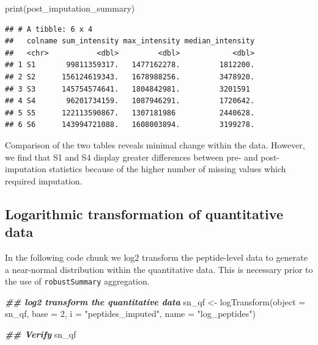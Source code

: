 \documentclass[9pt,a4paper,]{extarticle}
\newenvironment{Shaded}{\begin{snugshade}}{\end{snugshade}}
\newcommand{\AttributeTok}[1]{\textcolor[rgb]{0.77,0.63,0.00}{#1}}
\newcommand{\DecValTok}[1]{\textcolor[rgb]{0.00,0.00,0.81}{#1}}
\newcommand{\DocumentationTok}[1]{\textcolor[rgb]{0.56,0.35,0.01}{\textbf{\textit{#1}}}}
\newcommand{\FunctionTok}[1]{\textcolor[rgb]{0.00,0.00,0.00}{#1}}
\newcommand{\NormalTok}[1]{#1}
\newcommand{\OtherTok}[1]{\textcolor[rgb]{0.56,0.35,0.01}{#1}}
\newcommand{\StringTok}[1]{\textcolor[rgb]{0.31,0.60,0.02}{#1}}
\begin{document}
\begin{Shaded}
\begin{Highlighting}[]
\FunctionTok{print}\NormalTok{(post\_imputation\_summary)}
\end{Highlighting}
\end{Shaded}

\begin{verbatim}
## # A tibble: 6 x 4
##   colname sum_intensity max_intensity median_intensity
##   <chr>           <dbl>         <dbl>            <dbl>
## 1 S1       99811359317.   1477162278.         1812200.
## 2 S2      156124619343.   1678988256.         3478920.
## 3 S3      145754574641.   1804842981.         3201591 
## 4 S4       96201734159.   1087946291.         1720642.
## 5 S5      122113590867.   1307181986          2440628.
## 6 S6      143994721088.   1608003894.         3199278.
\end{verbatim}

Comparison of the two tables reveals minimal change within the data. However, we
find that S1 and S4 display greater differences between pre- and post-imputation
statistics because of the higher number of missing values which required
imputation.

\hypertarget{logarithmic-transformation-of-quantitative-data-1}{%
\subsection{Logarithmic transformation of quantitative data}\label{logarithmic-transformation-of-quantitative-data-1}}

In the following code chunk we log2 transform the peptide-level data to generate
a near-normal distribution within the quantitative data. This is necessary prior
to the use of \texttt{robustSummary} aggregation.

\begin{Shaded}
\begin{Highlighting}[]
\DocumentationTok{\#\# log2 transform the quantitative data}
\NormalTok{sn\_qf }\OtherTok{\textless{}{-}} \FunctionTok{logTransform}\NormalTok{(}\AttributeTok{object =}\NormalTok{ sn\_qf,}
                      \AttributeTok{base =} \DecValTok{2}\NormalTok{,}
                      \AttributeTok{i =} \StringTok{"peptides\_imputed"}\NormalTok{,}
                      \AttributeTok{name =} \StringTok{"log\_peptides"}\NormalTok{)}

\DocumentationTok{\#\# Verify}
\NormalTok{sn\_qf}
\end{Highlighting}
\end{Shaded}
\end{document}
